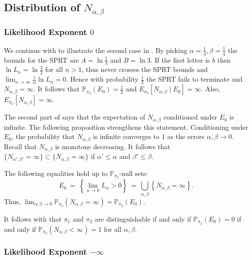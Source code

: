 \documentclass[a4paper,UKenglish,cleveref, autoref,mathscr]{lipics-v2019}
\newcommand{\PP}{\mathbb{P}}
\newcommand{\1}{\mathbbm{1}}
\newcommand{\liexp}{\lim_{n\rightarrow\infty} \frac1n \ln L_n}
\begin{document}
\subsection{Distribution of $N_{\alpha, \beta}$}
\subsubsection{Likelihood Exponent $0$}
\begin{example}
We continue with  to illustrate the second case in . By picking $\alpha = \frac14, \beta = \frac14$ the bounds for the SPRT are $A = \ln \frac13$ and $B = \ln 3$. If the first letter is $b$ then $\ln L_n = \ln \frac32$ for all $n > 1$, thus never crosses the SPRT bounds and $\liexp = 0$. Hence with probability $\frac12$ the SPRT fails to terminate  and $N_{\alpha, \beta} = \infty$. It follows that $\PP_{\pi_2}(E_0) = \frac12$ and $E_{\pi_2}[N_{\alpha, \beta} \mid E_0] = \infty$. Also, $E_{\pi_2}[N_{\alpha, \beta}] = \infty$. 
\end{example}
The second part of  says that the expectation of $N_{\alpha, \beta}$ conditioned under $E_0$ is infinite. The following proposition strengthens this statement. Conditioning under $E_0$, the probability that $N_{\alpha, \beta}$ is infinite converges to $1$ as the errors $\alpha, \beta \rightarrow 0$. Recall that $N_{\alpha, \beta}$ is monotone decreasing. It follows that $\{ N_{\alpha', \beta'} = \infty \} \subset \{ N_{\alpha, \beta} = \infty \}$ if $\alpha' \leq \alpha$ and $\beta' \leq \beta$.
\begin{proposition}\label{probexp0}
The following equalities hold up to $\PP_{\pi_2}$-null sets:
\begin{equation*}
E_0 ~=~ \left\{\lim_{n \rightarrow 0} L_n > 0 \right\} ~=~ \bigcup_{\alpha, \beta} \left\{N_{\alpha, \beta} = \infty\right\}.
\end{equation*}
Thus, $\lim_{\alpha, \beta \rightarrow 0} \PP_{\pi_2}(N_{\alpha, \beta} = \infty) = \PP_{\pi_2}(E_0)$.
\end{proposition}


It follows with  that $\pi_1$ and $\pi_2$ are distinguishable if and only if $\PP_{\pi_2}(E_0) = 0$ if and only if $\PP_{\pi_2}(N_{\alpha, \beta} < \infty) = 1$ for all $\alpha, \beta$. 

\subsubsection{Likelihood Exponent $-\infty$}
\end{document}
